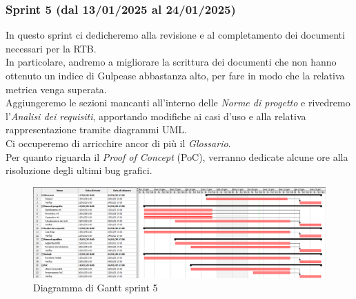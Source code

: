        \subsubsection{Sprint 5 (dal 13/01/2025 al 24/01/2025)}
        In questo sprint ci dedicheremo alla revisione e al completamento dei documenti necessari per la RTB.
        \\In particolare, andremo a migliorare la scrittura dei documenti che non hanno ottenuto un indice di Gulpease abbastanza alto, per fare in modo che la relativa metrica venga superata.
        \\Aggiungeremo le sezioni mancanti all'interno delle \textit{Norme di progetto} e rivedremo l'\textit{Analisi dei requisiti}, apportando modifiche ai casi d'uso e alla relativa rappresentazione tramite diagrammi UML.
        \\Ci occuperemo di arricchire ancor di più il \textit{Glossario}.
        \\Per quanto riguarda il \textit{Proof of Concept} (PoC), verranno dedicate alcune ore alla risoluzione degli ultimi bug grafici.

        \begin{figure}[h!]
            \centering
            \includegraphics[scale = 0.4]{template/images/gantt5.png}
            \caption{Diagramma di Gantt sprint 5}
            \label{fig:3.4} %
        \end{figure}

 
